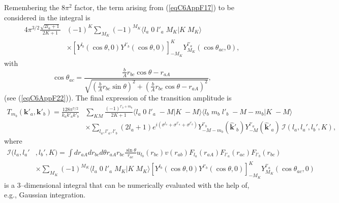 Remembering the $8\pi^2$ factor, the term arising from (\ref{eqC6AppF17}) to be considered in the integral is
\begin{equation}\label{eqC6AppG24}
\begin{split}
4\pi^{3/2}\frac{\sqrt{2l_a+1}}{2K+1}&(-1)^K\sum_{M_K}(-1)^{M_K} \langle l_a\;0\;l'_a\;M_K|K\;M_K\rangle\\
&\times \left[ Y^{l_b} (\cos \theta,0) Y^{l'_b} (\cos \theta,0)\right]^{K}_{-M_K} Y^{l'_a}_{M_K} (\cos \theta_{ac},0),
\end{split}
\end{equation}
with
\begin{equation}\label{eqC6AppG25}
\cos \theta_{ac}=\frac{\frac{b}{A}r_{bc}\cos \theta-r_{aA}}{\sqrt{\left(\frac{b}{A}r_{bc}\sin \theta\right)^2+\left(\frac{b}{A}r_{bc}\cos \theta-r_{aA}\right)^2}},
\end{equation}
(see (\ref{eqC6AppF22})). The final expression of the transition amplitude is
\begin{equation}\label{eqC6AppG26}
\begin{split}
T_{m_b}(\mathbf{k}'_a,\mathbf{k}'_b)=\frac{128\pi^{7/2}}{k_ak'_ak'_b}&\sum_{KM}\frac{(-1)^{l'_b+m_b}}{2K+1}\langle l_a\;0\;l'_a\;-M|K\;-M\rangle\langle l_b\;m_b\;l'_b\;-M-m_b|K\;-M\rangle\\
&\times \sum_{l_a,l'_a,l'_b}(2l_a+1) e^{i(\sigma^{l_a}+\sigma^{l'_a}+\sigma^{l'_b})}Y^{l'_b}_{-M-m_b} (\hat{ \mathbf k}'_{b}) Y^{l'_a}_{-M} (\hat{ \mathbf k}'_{a})\,\mathcal I(l_a,l_a',l_b',K),
\end{split}
\end{equation}
where
\begin{equation}\label{eqC6AppG27}
\begin{split}
\mathcal I(l_a,l_a'&,l_b',K)=\int dr_{aA} dr_{bc}d\theta r_{aA}r_{bc} \frac{\sin \theta}{r_{ac}} u_{l_b}(r_{bc})v(r_{ab})F_{l_a}(r_{aA})  F_{l'_a}(r_{ac})F_{l'_b}(r_{bc}) \\
&\times \sum_{M_K} (-1)^{M_K}\langle l_a\;0\;l'_a\;M_K|K\;M_K\rangle \left[ Y^{l_b} (\cos \theta,0) Y^{l'_b} (\cos \theta,0)\right]^{K}_{-M_K} Y^{l'_a}_{M_K} (\cos \theta_{ac},0)
\end{split}
\end{equation}
is a 3--dimensional integral that can be numerically evaluated with the help of, e.g., Gaussian integration.

